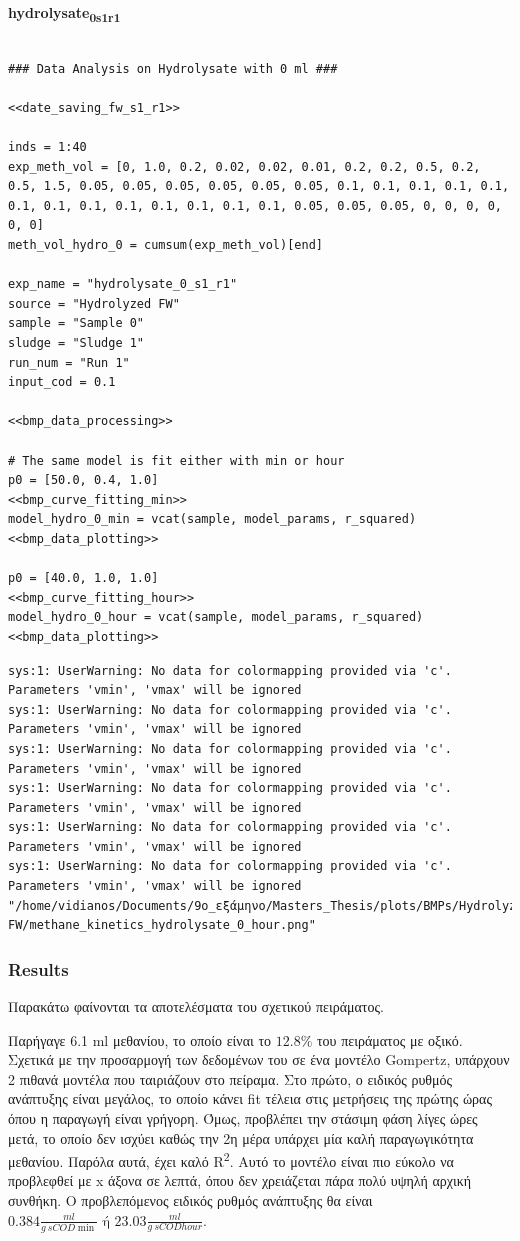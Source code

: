 \documentclass[11pt]{article}
\begin{document}
\textbf{hydrolysate\textsubscript{0}\textsubscript{s1}\textsubscript{r1}}
\begin{verbatim}

### Data Analysis on Hydrolysate with 0 ml ###

<<date_saving_fw_s1_r1>>

inds = 1:40
exp_meth_vol = [0, 1.0, 0.2, 0.02, 0.02, 0.01, 0.2, 0.2, 0.5, 0.2, 0.5, 1.5, 0.05, 0.05, 0.05, 0.05, 0.05, 0.05, 0.1, 0.1, 0.1, 0.1, 0.1, 0.1, 0.1, 0.1, 0.1, 0.1, 0.1, 0.1, 0.1, 0.05, 0.05, 0.05, 0, 0, 0, 0, 0, 0]
meth_vol_hydro_0 = cumsum(exp_meth_vol)[end]

exp_name = "hydrolysate_0_s1_r1"
source = "Hydrolyzed FW"
sample = "Sample 0"
sludge = "Sludge 1"
run_num = "Run 1"
input_cod = 0.1

<<bmp_data_processing>>

# The same model is fit either with min or hour
p0 = [50.0, 0.4, 1.0]
<<bmp_curve_fitting_min>>
model_hydro_0_min = vcat(sample, model_params, r_squared)
<<bmp_data_plotting>>

p0 = [40.0, 1.0, 1.0]
<<bmp_curve_fitting_hour>>
model_hydro_0_hour = vcat(sample, model_params, r_squared)
<<bmp_data_plotting>>
\end{verbatim}

\begin{verbatim}
sys:1: UserWarning: No data for colormapping provided via 'c'. Parameters 'vmin', 'vmax' will be ignored
sys:1: UserWarning: No data for colormapping provided via 'c'. Parameters 'vmin', 'vmax' will be ignored
sys:1: UserWarning: No data for colormapping provided via 'c'. Parameters 'vmin', 'vmax' will be ignored
sys:1: UserWarning: No data for colormapping provided via 'c'. Parameters 'vmin', 'vmax' will be ignored
sys:1: UserWarning: No data for colormapping provided via 'c'. Parameters 'vmin', 'vmax' will be ignored
sys:1: UserWarning: No data for colormapping provided via 'c'. Parameters 'vmin', 'vmax' will be ignored
"/home/vidianos/Documents/9o_εξάμηνο/Masters_Thesis/plots/BMPs/Hydrolyzed FW/methane_kinetics_hydrolysate_0_hour.png"
\end{verbatim}

\subsubsection{Results}
\label{sec:org31b66cd}
Παρακάτω φαίνονται τα αποτελέσματα του σχετικού πειράματος.

Παρήγαγε 6.1 ml μεθανίου, το οποίο είναι το \(12.8 \%\) του πειράματος με οξικό. Σχετικά με την προσαρμογή των δεδομένων του σε ένα μοντέλο Gompertz, υπάρχουν 2 πιθανά μοντέλα που ταιριάζουν στο πείραμα. Στο πρώτο, ο ειδικός ρυθμός ανάπτυξης είναι μεγάλος, το οποίο κάνει fit τέλεια στις μετρήσεις της πρώτης ώρας όπου η παραγωγή είναι γρήγορη. Όμως, προβλέπει την στάσιμη φάση λίγες ώρες μετά, το οποίο δεν ισχύει καθώς την 2η μέρα υπάρχει μία καλή παραγωγικότητα μεθανίου. Παρόλα αυτά, έχει καλό R\textsuperscript{2}. Αυτό το μοντέλο είναι πιο εύκολο να προβλεφθεί με x άξονα σε λεπτά, όπου δεν χρειάζεται πάρα πολύ υψηλή αρχική συνθήκη. Ο προβλεπόμενος ειδικός ρυθμός ανάπτυξης θα είναι \(0.384 \frac{ml}{g ~ sCOD \min } \text{ ή } 23.03 \frac{ml}{g ~ sCOD hour}\).
\end{document}
